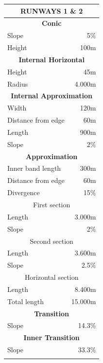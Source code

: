 	\begin{longtable}[htb]{@{}lr@{}}
		\toprule[3pt]
		\multicolumn{2}{c}{\textbf{\large RUNWAYS 1 \& 2  } }\\ \midrule[2pt]
		\multicolumn{2}{c}{\textbf{Conic} }\\
		\midrule[0.5pt]
		Slope & 5\%\\
		Height & 100m\\
		\midrule[2pt]
		\multicolumn{2}{c}{\textbf{Internal Horizontal} }\\
		\midrule[0.5pt]
		Height & 45m\\
		Radius & 4.000m\\
		\midrule[2pt]
		\multicolumn{2}{c}{\textbf{Internal Approximation} }\\
		\midrule[0.5pt]
		Width & 120m\\
		Distance from edge & 60m\\
		Length & 900m\\
		Slope & 2\% \\
		\midrule[2pt]
		\multicolumn{2}{c}{\textbf{Approximation} }\\
		\midrule[0.5pt]
		Inner band length & 300m\\
		Distance from edge & 60m\\
		Divergence & 15\% \\
		\midrule[0.5pt]
		\multicolumn{2}{c}{First section} \\
		\midrule[0.5pt]
		Length & 3.000m\\
		Slope & 2\%\\
		\midrule[0.5pt]
		\multicolumn{2}{c}{Second section} \\
		\midrule[0.5pt]
		Length & 3.600m\\
		Slope & 2.5\%\\
		\midrule[0.5pt]
		\multicolumn{2}{c}{Horizontal section} \\
		\midrule[0.5pt]
		Length & 8.400m\\
		Total length & 15.000m\\
		\midrule[2pt]
		\multicolumn{2}{c}{\textbf{Transition} }\\
		\midrule[0.5pt]
		Slope & 14.3\%\\
		\midrule[2pt]
		\multicolumn{2}{c}{\textbf{Inner Transition} }\\
		\midrule[0.5pt]
		Slope & 33.3\%\\
		\midrule[2pt]
		\vspace{5cm}&\vspace{5cm}\\
		\midrule[2pt]

\end{longtable}
